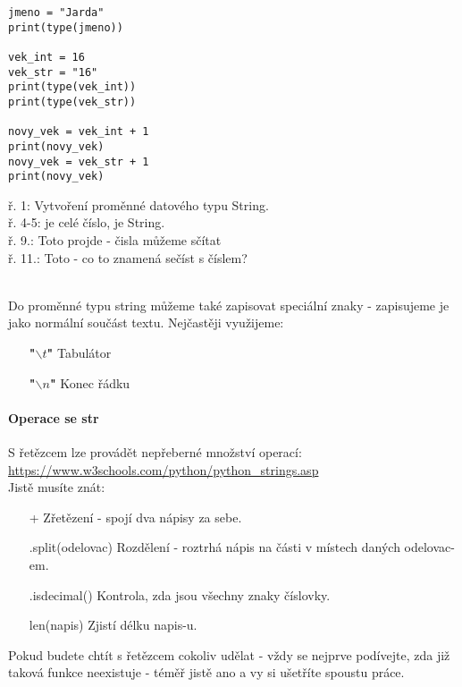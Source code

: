 \begin{minipage}[t]{.45\textwidth}
\begin{code}
\begin{verbatim}
jmeno = "Jarda"
print(type(jmeno))

vek_int = 16
vek_str = "16"
print(type(vek_int))
print(type(vek_str))

novy_vek = vek_int + 1
print(novy_vek)
novy_vek = vek_str + 1
print(novy_vek)
\end{verbatim}

\label{code:typy_str}
\end{code}
\end{minipage}
\begin{minipage}[t]{.45\textwidth}
\vspace{0cm}
ř. 1:	Vytvoření proměnné  datového typu String.\\
ř. 4-5:	 je celé číslo,  je String.\\
ř. 9.:	Toto projde - čisla můžeme sčítat\\
ř. 11.:	Toto  - co to znamená sečíst  s číslem?
\end{minipage}\\ 

Do proměnné typu string můžeme také zapisovat speciální znaky - zapisujeme je jako normální součást textu. Nejčastěji využijeme:
\begin{itemize}
\item[\textbf{"$ \backslash t $"}] Tabulátor
\item[\textbf{"$ \backslash n $"}] Konec řádku
\end{itemize}

\paragraph{Operace se str}
S řetězcem lze provádět nepřeberné množství operací: \url{https://www.w3schools.com/python/python_strings.asp}\\
Jistě musíte znát:
\begin{enumerate}
\item[+] Zřetězení - spojí dva nápisy za sebe.
\item[.split(odelovac)] Rozdělení - roztrhá nápis na části v místech daných odelovac-em.
\item[.isdecimal()] Kontrola, zda jsou všechny znaky číslovky.
\item[len(napis)] Zjistí délku napis-u.
\end{enumerate}
Pokud budete chtít s řetězcem cokoliv udělat - vždy se nejprve podívejte, zda již taková funkce neexistuje - téměř jistě ano a vy si ušetříte spoustu práce.

